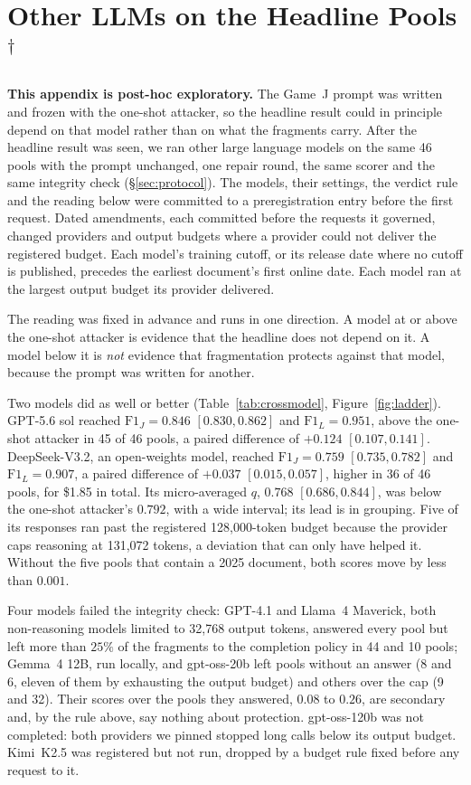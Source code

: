 \documentclass[sigconf,review]{acmart}
\newcommand{\FJ}{\ensuremath{\mathrm{F1}_{J}}}
\newcommand{\FL}{\ensuremath{\mathrm{F1}_{L}}}
\newcommand{\posthoc}{\ensuremath{^{\dagger}}}
\begin{document}
\section{Other LLMs on the Headline Pools\posthoc}
\label{app:crossmodel}
\textbf{This appendix is post-hoc exploratory.} The Game~J prompt was written
and frozen with the one-shot attacker, so the headline result could in
principle depend on that model rather than on what the fragments carry. After
the headline result was seen, we ran other large language models on the same
46 pools with the prompt unchanged, one repair round, the same scorer and the
same integrity check (\S\ref{sec:protocol}). The models, their settings, the
verdict rule and the reading below were committed to a preregistration entry
before the first request. Dated amendments, each committed before the requests
it governed, changed providers and output budgets where a provider could not
deliver the registered budget. Each model's training cutoff, or its release
date where no cutoff is published, precedes the earliest document's first
online date. Each model ran at the largest output budget its provider
delivered.

The reading was fixed in advance and runs in one direction. A model at or
above the one-shot attacker is evidence that the headline does not depend on
it. A model below it is \emph{not} evidence that fragmentation protects against
that model, because the prompt was written for another.

Two models did as well or better (Table~\ref{tab:crossmodel},
Figure~\ref{fig:ladder}). GPT-5.6 sol reached $\FJ = 0.846$ $[0.830, 0.862]$
and $\FL = 0.951$, above the one-shot attacker in 45 of 46 pools, a paired
difference of $+0.124$ $[0.107, 0.141]$. DeepSeek-V3.2, an open-weights model,
reached $\FJ = 0.759$ $[0.735, 0.782]$ and $\FL = 0.907$, a paired difference
of $+0.037$ $[0.015, 0.057]$, higher in 36 of 46 pools, for \$1.85 in total. Its
micro-averaged $q$, $0.768$ $[0.686, 0.844]$, was below the one-shot
attacker's $0.792$, with a wide interval; its lead is in grouping. Five of its
responses ran past the registered 128{,}000-token budget because the provider
caps reasoning at 131{,}072 tokens, a deviation that can only have helped it.
Without the five pools that contain a 2025 document, both scores move by less
than $0.001$.

Four models failed the integrity check: GPT-4.1 and Llama~4 Maverick, both
non-reasoning models limited to 32{,}768 output tokens, answered every pool but
left more than $25\%$ of the fragments to the completion policy in 44 and 10
pools; Gemma~4 12B, run locally, and gpt-oss-20b left pools without an answer
(8 and 6, eleven of them by exhausting the output budget) and others over the
cap (9 and 32). Their
scores over the pools they answered, $0.08$ to $0.26$, are secondary and, by
the rule above, say nothing about protection. gpt-oss-120b was not completed:
both providers we pinned stopped long calls below its output budget. Kimi~K2.5
was registered but not run, dropped by a budget rule fixed before any request
to it.
\end{document}
